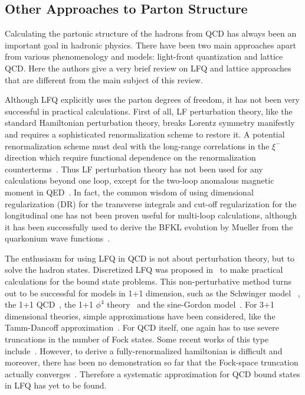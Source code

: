 \subsection{Other Approaches to Parton Structure}
\label{sec:intro_other}

Calculating the partonic structure of the hadrons from QCD has always
been an important goal in hadronic physics. There have been two main
approaches apart from various phenomenology and models: light-front quantization
and lattice QCD. Here the authors give a very brief review on LFQ and lattice
approaches that are different from the main subject of this review.

Although LFQ explicitly uses the parton degrees of freedom, it has not been very successful
in practical calculations. First of all, LF perturbation theory,
like the standard Hamiltonian perturbation theory, breaks Lorentz
symmetry manifestly and requires a sophisticated renormalization scheme to restore it.
A potential renormalization scheme must deal with the long-range correlations
in the $\xi^-$ direction which require functional dependence on
the renormalization counterterms~\cite{Wilson:1994fk}. Thus LF perturbation theory has not been used
for any calculations beyond one loop, except for the two-loop anomalous magnetic
moment in QED~\cite{Langnau:1992zj}. In fact, the common wisdom
of using dimensional regularization (DR) for the transverse integrals
and cut-off regularization for the longitudinal one has not been proven useful for
multi-loop calculations, although it has been successfully used to
derive the BFKL evolution by Mueller from the quarkonium wave
functions~\cite{Mueller:1993rr}.

The enthusiasm for using LFQ in QCD is not about perturbation theory, but to solve the hadron states.
Discretized LFQ was proposed in~\cite{Pauli:1985ps} to
make practical calculations for the
bound state problems. This non-perturbative method turns out to be successful
for models in 1+1 dimension, such as the Schwinger
model ~\cite{McCartor:1994im,Harada:1995au}, the 1+1 QCD~\cite{Burkardt:1989wy,Srivastava:2000cf},
the 1+1 $\phi^4$ theory~\cite{Harindranath:1987db} and the sine-Gordon model~\cite{Burkardt:1992sz}.
For 3+1 dimensional theories, simple approximations have been considered, like
the Tamm-Dancoff approximation~\cite{Perry:1990mz}. For QCD itself, one again has
to use severe truncations in the number of Fock states. Some recent works
of this type include~\cite{Vary:2009gt,Lan:2019vui,Jia:2019iyk}.
However, to derive a fully-renormalized hamiltonian is difficult and moreover,
there has been no demonstration so far that the Fock-space truncation actually converges~\cite{Wilson:1994fk}.
Therefore a systematic approximation for QCD bound states in LFQ has yet to be found.

